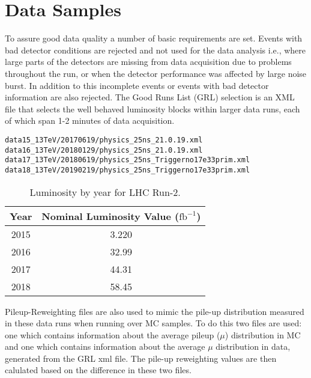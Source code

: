 \chapter{Data Samples}

To assure good data quality a number of basic requirements are set.  Events with bad detector conditions are rejected and not used for the data analysis i.e., where large parts of the detectors are missing from data acquisition due to problems throughout the run, or when the detector performance was affected by large noise burst.  In addition to this incomplete events or events with bad detector information are also rejected.  
The Good Runs List (GRL) selection is an XML file that selects the well behaved luminosity blocks within larger data runs, each of which span 1-2 minutes of data acquisition.
\begin{verbatim}
data15_13TeV/20170619/physics_25ns_21.0.19.xml 
data16_13TeV/20180129/physics_25ns_21.0.19.xml 
data17_13TeV/20180619/physics_25ns_Triggerno17e33prim.xml
data18_13TeV/20190219/physics_25ns_Triggerno17e33prim.xml
\end{verbatim}
\begin{table}[h]
\begin{center}
{\renewcommand{\arraystretch}{1.2}
\begin{tabular}{c|c}
\hline
 Year & Nominal Luminosity Value ($\text{fb}^{-1}$) \\ \hline 2015 & 3.220  \\
2016 & 32.99 \\
2017 & 44.31 \\
2018 & 58.45 \\ \hline
\end{tabular}
\caption{Luminosity by year for LHC Run-2. }
}
\end{center}
\end{table}

Pileup-Reweighting files are also used to mimic the pile-up distribution measured in these data runs when running over MC samples.  To do this two files are used: one which contains information about the average pileup ($\mu$) distribution in MC and one which contains information about the average $\mu$ distribution in data, generated from the GRL xml file.  The pile-up reweighting values are then calulated based on the difference in these two files.
